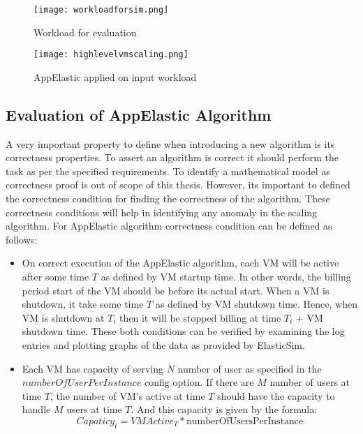 \begin{figure}[h]
  \begin{center}
    \texttt{[image: workloadforsim.png]}
    \caption{Workload for evaluation}
    \label{figure:workloadforsim}
  \end{center}
\end{figure}
\begin{figure}[h]
  \begin{center}
    \texttt{[image: highlevelvmscaling.png]}
    \caption{AppElastic applied on input workload}
    \label{figure:appelasticapplication}
  \end{center}
\end{figure}
\subsection{Evaluation of AppElastic Algorithm}
\label{sub:Evaluation of AppElastic Algorithm}
A very important property to define when introducing a new algorithm is its correctness properties. To assert an algorithm is correct it should perform the task as per the specified requirements. To identify a mathematical model as correctness proof is out of scope of this thesis. However, its important to defined the correctness condition for finding the correctness of the algorithm. These correctness conditions will help in identifying any anomaly in the scaling algorithm. For AppElastic algorithm correctness condition can be defined as follows:
\begin{itemize}
  \item On correct execution of the AppElastic algorithm, each VM will be active after some time \(T\) as defined by VM startup time. In other words, the billing period start of the VM should be before its actual start. When a VM is shutdown, it take some time \(T\) as defined by VM shutdown time. Hence, when VM is shutdown at \(T_{i}\) then it will be stopped billing at time \(T_{i}\) + VM shutdown time. These both conditions can be verified by examining the log entries and plotting graphs of the data as provided by ElasticSim.
  \item Each VM has capacity of serving \(N\) number of user as specified in the \(numberOfUserPerInstance\) config option. If there are \(M\) number of users at time \(T\), the number of VM's active at time \(T\) should have the capacity to handle \(M\) users at time \(T\). And this capacity is given by the formula:
  \begin{equation}
    Capaticy_{t} = VM Active_{T} * \textrm{numberOfUsersPerInstance}
  \end{equation}
\end{itemize}

